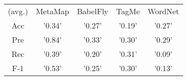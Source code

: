 \begin{tabular}{ccccc}
(avg.) & MetaMap & BabelFly & TagMe & WordNet\\ 
Acc & '0.34' & '0.27' & '0.19' & '0.27'\\ 
Pre & '0.84' & '0.33' & '0.30' & '0.29'\\ 
Rec & '0.39' & '0.20' & '0.31' & '0.09'\\ 
F-1 & '0.53' & '0.25' & '0.30' & '0.13'\\ 

\end{tabular}
